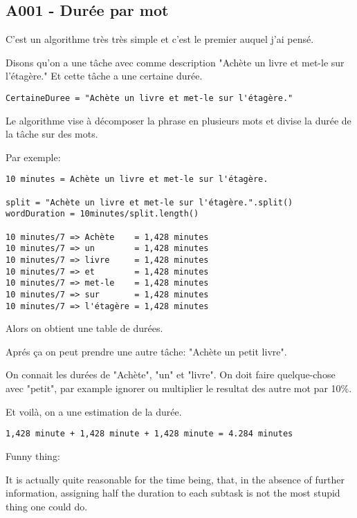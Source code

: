 \newpage{}

\subsection{A001 - Durée par mot}

C'est un algorithme très très simple et c'est le premier 
auquel j'ai pensé.

Disons qu'on a une tâche avec comme description "Achète 
un livre et met-le sur l'étagère." Et cette tâche a une 
certaine durée.

\begin{verbatim}
CertaineDuree = "Achète un livre et met-le sur l'étagère."
\end{verbatim}

Le algorithme vise à décomposer la phrase en plusieurs mots 
et divise la durée de la tâche sur des mots.

Par exemple:
\begin{verbatim}
10 minutes = Achète un livre et met-le sur l'étagère.

split = "Achète un livre et met-le sur l'étagère.".split()
wordDuration = 10minutes/split.length()

10 minutes/7 => Achète    = 1,428 minutes
10 minutes/7 => un        = 1,428 minutes
10 minutes/7 => livre     = 1,428 minutes
10 minutes/7 => et        = 1,428 minutes
10 minutes/7 => met-le    = 1,428 minutes
10 minutes/7 => sur       = 1,428 minutes
10 minutes/7 => l'étagère = 1,428 minutes
\end{verbatim}

Alors on obtient une table de durées.

Aprés ça on peut prendre une autre tâche: 
"Achète un petit livre".

On connait les durées de "Achète", "un" et "livre".
On doit faire quelque-chose avec "petit", par example 
ignorer ou multiplier le resultat des autre mot par 10\%.  

Et voilà, on a une estimation de la durée.

\begin{verbatim}
1,428 minute + 1,428 minute + 1,428 minute = 4.284 minutes
\end{verbatim}

Funny thing:

It is actually quite reasonable for the time being, that, in the absence
of further information, assigning half the duration to each subtask is
not the most stupid thing one could do.

